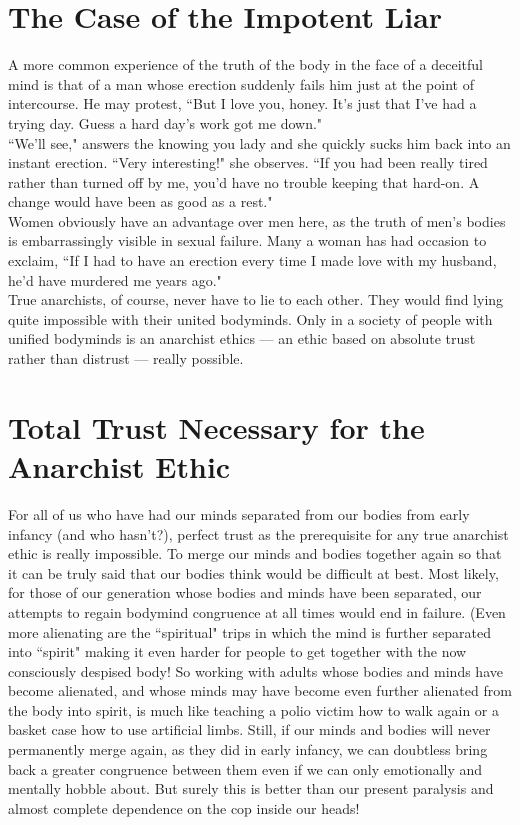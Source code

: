 \section*{The Case of the Impotent Liar}
A more common experience of the truth of the body in the face of a deceitful mind is that of a man whose erection suddenly fails him just at the point of intercourse. He may protest, ``But I love you, honey. It's just that I've had a trying day. Guess a hard day's work got me down."\\
``We'll see," answers the knowing you lady and she quickly sucks him back into an instant erection. ``Very interesting!" she observes. ``If you had been really tired rather than turned off by me, you'd have no trouble keeping that hard-on. A change would have been as good as a rest."\\
Women obviously have an advantage over men here, as the truth of men's bodies is embarrassingly visible in sexual failure. Many a woman has had occasion to exclaim, ``If I had to have an erection every time I made love with my husband, he'd have murdered me years ago."\\
True anarchists, of course, never have to lie to each other. They would find lying quite impossible with their united bodyminds. Only in a society of people with unified bodyminds is an anarchist ethics --- an ethic based on absolute trust rather than distrust --- really possible.

\section*{Total Trust Necessary for the Anarchist Ethic}
For all of us who have had our minds separated from our bodies from early infancy (and who hasn't?), perfect trust as the prerequisite for any true anarchist ethic is really impossible. To merge our minds and bodies together again so that it can be truly said that our bodies think would be difficult at best. Most likely, for those of our generation whose bodies and minds have been separated, our attempts to regain bodymind congruence at all times would end in failure. (Even more alienating are the ``spiritual" trips in which the mind is further separated into ``spirit" making it even harder for people to get together with the now consciously despised body! So working with adults whose bodies and minds have become alienated, and whose minds may have become even further alienated from the body into spirit, is much like teaching a polio victim how to walk again or a basket case how to use artificial limbs. Still, if our minds and bodies will never permanently merge again, as they did in early infancy, we can doubtless bring back a greater congruence between them even if we can only emotionally and mentally hobble about. But surely this is better than our present paralysis and almost complete dependence on the cop inside our heads!

